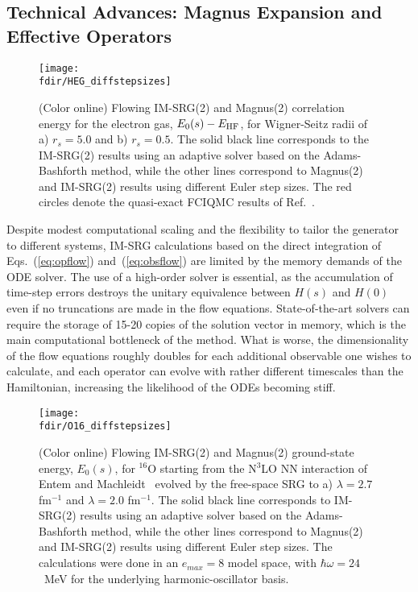 \subsection{Technical Advances: Magnus Expansion and Effective Operators}
\label{sec:magnus}

\begin{figure}[t]
\begin{center}
\texttt{[image: \\fdir/HEG\_diffstepsizes]}
\caption{\label{fig:timestep_HEG}
(Color online) Flowing IM-SRG(2) and Magnus(2) correlation energy for 
the electron gas, $E_0(s)-E_{\rm HF}$, for Wigner-Seitz radii of a)
$r_s=5.0$ and b) $r_s=0.5$. The solid black line corresponds to the
IM-SRG(2) results using an adaptive solver based on the
Adams-Bashforth method, while the other lines correspond to Magnus(2)
and IM-SRG(2) results using different Euler step sizes. The red
circles denote the quasi-exact FCIQMC results of
Ref.~\cite{Shepherd:2012hl}.}
\end{center}
\end{figure}

Despite modest computational scaling and the flexibility to tailor the
generator to different systems, IM-SRG calculations based on the
direct integration of Eqs.~(\ref{eq:opflow}) and~(\ref{eq:obsflow}) are
limited by the memory demands of the ODE solver. The use of a
high-order solver is essential, as the accumulation of time-step
errors destroys the unitary equivalence between $H(s)$ and $H(0)$ even
if no truncations are made in the flow equations. State-of-the-art
solvers can require the storage of 15-20 copies of the solution vector
in memory, which is the main computational bottleneck of the method.
What is worse, the dimensionality of the flow equations roughly
doubles for each additional observable one wishes to calculate, and
each operator can evolve with rather different timescales than the
Hamiltonian, increasing the likelihood of the ODEs becoming
stiff.

\begin{figure}[t]
\begin{center}
\texttt{[image: \\fdir/O16\_diffstepsizes]}
\caption{\label{fig:timestep_O16}
(Color online) Flowing IM-SRG(2) and Magnus(2) ground-state energy, 
$E_0(s)$, for $^{16}$O starting from the N$^3$LO NN interaction of
Entem and Machleidt~\cite{Entem:2003th,Machleidt:2011bh} evolved by
the free-space SRG to a) $\lambda=2.7$ fm$^{-1}$ and $\lambda = 2.0$
fm$^{-1}$. The solid black line corresponds to IM-SRG(2) results using
an adaptive solver based on the Adams-Bashforth method, while the
other lines correspond to Magnus(2) and IM-SRG(2) results using
different Euler step sizes. The calculations were done in an
$e_{max}=8$ model space, with $\hbar\omega = 24$~MeV for the
underlying harmonic-oscillator basis.}
\end{center}
\end{figure}

